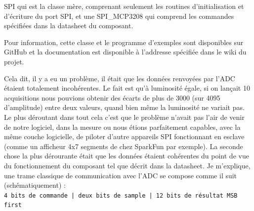 {		SPI qui est la classe mère, comprenant seulement les routines d'initialisation et d'écriture
		du port SPI, et une SPI\_MCP3208 qui comprend les commandes spécifiées dans la datasheet
		du composant.
		\par
		Pour information, cette classe et le programme d'exemples sont disponibles sur GitHub et la
		documentation est disponible à l'addresse spécifiée dans le wiki du projet.
		\par
		Cela dit, il y a eu un problème, il était que les données renvoyées par l'ADC étaient
		totalement incohérentes. Le fait est qu'à luminosité égale, si on lançait 10 acquisitions
		nous pouvions obtenir des écarts de plus de 3000 (sur 4095 d'amplitude) entre
		deux valeurs, quand bien même la luminosité ne variait pas. Le plus déroutant
		dans tout cela c'est que le problème n'avait pas l'air de venir de notre logiciel,
		dans la mesure ou nous étions parfaitement capables, avec la même couche logicielle,
		de piloter d'autre appareils SPI fonctionnant en esclave (comme un afficheur 4x7
		segments de chez SparkFun par exemple). La seconde chose la plus dérourante était
		que les données étaient cohérentes du point de vue du fonctionnement du composant
		tel que décrit dans la datasheet. Je m'explique, une trame classique de communication avec
		l'ADC se compose comme il suit (schématiquement) :
		\\
		\texttt{4 bits de commande | deux bits de sample | 12 bits de résultat MSB first}\\

}
